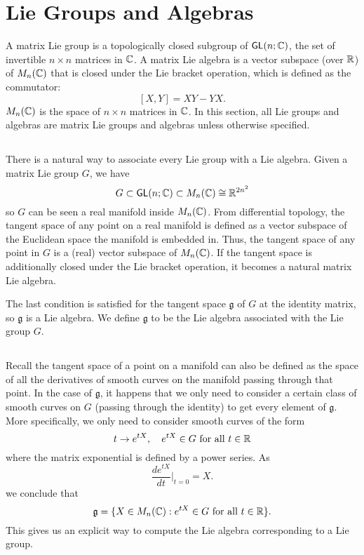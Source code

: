 \section{Lie Groups and Algebras}
A matrix Lie group is a topologically closed subgroup of $\operatorname{\textsf{GL}}(n; {\mathbb C})$, the set of invertible $n \times n$ matrices in ${\mathbb C}$. A matrix Lie algebra is a vector subspace (over ${\mathbb R}$) of $M_n({\mathbb C})$ that is closed under the Lie bracket operation, which is defined as the commutator:
\[
    [X, Y] = XY - YX.
\]
$M_n({\mathbb C})$ is the space of $n \times n$ matrices in ${\mathbb C}$. In this section, all Lie groups and algebras are matrix Lie groups and algebras unless otherwise specified.

\subsection{}
There is a natural way to associate every Lie group with a Lie algebra. Given a matrix Lie group $G$, we have
\[
    G \subset \operatorname{\textsf{GL}}(n; {\mathbb C}) \subset M_n({\mathbb C}) \cong {\mathbb R}^{2n^2}
\]
so $G$ can be seen a real manifold inside $M_n({\mathbb C})$. From differential topology, the tangent space of any point on a real manifold is defined as a vector subspace of the Euclidean space the manifold is embedded in. Thus, the tangent space of any point in $G$ is a (real) vector subspace of $M_n({\mathbb C})$. If the tangent space is additionally closed under the Lie bracket operation, it becomes a natural matrix Lie algebra.

The last condition is satisfied for the tangent space $\mathfrak g$ of $G$ at the identity matrix, so $\mathfrak g$ is a Lie algebra. We define $\mathfrak g$ to be the Lie algebra associated with the Lie group $G$.

\subsection{}
Recall the tangent space of a point on a manifold can also be defined as the space of all the derivatives of smooth curves on the manifold passing through that point. In the case of $\mathfrak g$, it happens that we only need to consider a certain class of smooth curves on $G$ (passing through the identity) to get every element of $\mathfrak g$. More specifically, we only need to consider smooth curves of the form
\[
    t \rightarrow e^{tX}, \quad e^{tX} \in G \text{ for all } t \in {\mathbb R}
\]
where the matrix exponential is defined by a power series. As
\[
    \frac{d e^{tX}}{dt} \Bigr|_{t = 0} = X.
\]
we conclude that
\[
    \mathfrak g = \{X \in M_n({\mathbb C}) : e^{tX} \in G \text{ for all } t \in {\mathbb R}\}.
\]
This gives us an explicit way to compute the Lie algebra corresponding to a Lie group.

